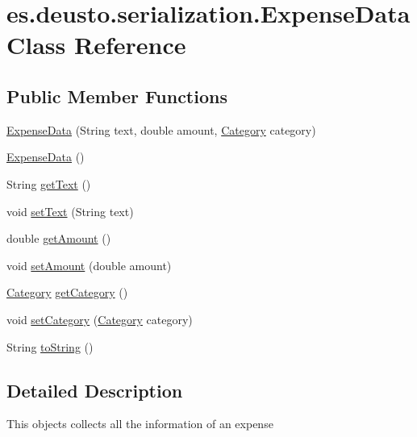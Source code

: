 \hypertarget{classes_1_1deusto_1_1serialization_1_1_expense_data}{}\section{es.\+deusto.\+serialization.\+Expense\+Data Class Reference}
\label{classes_1_1deusto_1_1serialization_1_1_expense_data}
\subsection*{Public Member Functions}
\begin{DoxyCompactItemize}
\item 
\hyperlink{classes_1_1deusto_1_1serialization_1_1_expense_data_ae84c88e2ce6f4dbe911a133c7bc63b36}{Expense\+Data} (String text, double amount, \hyperlink{enumes_1_1deusto_1_1server_1_1jdo_1_1_category}{Category} category)
\item 
\hyperlink{classes_1_1deusto_1_1serialization_1_1_expense_data_a97e68a5653ec71fa336e830b5b6615c3}{Expense\+Data} ()
\item 
String \hyperlink{classes_1_1deusto_1_1serialization_1_1_expense_data_a093995ac1e4a4e3e85c9c46ec739515d}{get\+Text} ()
\item 
void \hyperlink{classes_1_1deusto_1_1serialization_1_1_expense_data_ae9cc50bc7eddb9ff751f5bb9a02eb0d4}{set\+Text} (String text)
\item 
double \hyperlink{classes_1_1deusto_1_1serialization_1_1_expense_data_a9b0652de8009eca9d315aa0d041138a2}{get\+Amount} ()
\item 
void \hyperlink{classes_1_1deusto_1_1serialization_1_1_expense_data_a9e78d6a6acc6fc0fd05f28a09432caf2}{set\+Amount} (double amount)
\item 
\hyperlink{enumes_1_1deusto_1_1server_1_1jdo_1_1_category}{Category} \hyperlink{classes_1_1deusto_1_1serialization_1_1_expense_data_aa53e9ee1ef7220a272b043e475f504f1}{get\+Category} ()
\item 
void \hyperlink{classes_1_1deusto_1_1serialization_1_1_expense_data_a54bbe919419f8750caaed58a09d2b326}{set\+Category} (\hyperlink{enumes_1_1deusto_1_1server_1_1jdo_1_1_category}{Category} category)
\item 
String \hyperlink{classes_1_1deusto_1_1serialization_1_1_expense_data_a89e0bc878ddf158ee69e56f26d0aa8e0}{to\+String} ()
\end{DoxyCompactItemize}


\subsection{Detailed Description}
This objects collects all the information of an expense 

